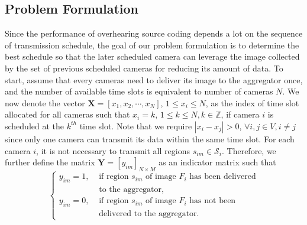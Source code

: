 \subsection{Problem Formulation}
Since the performance of overhearing source coding depends a lot on the sequence of transmission schedule, the goal of our problem formulation is to determine the best schedule so that the later scheduled camera can leverage the image collected by the set of previous scheduled cameras for reducing its amount of data.
To start, assume that every cameras need to deliver its image to the aggregator once, and the number of available time slots is equivalent to number of cameras $N$.
We now denote the vector ${\mathbf{X} = [x_1, x_2, \cdots, x_N]}$, ${1 \leq x_i \leq N}$, as the index of time slot allocated for all cameras such that $x_i = k$, ${1 \leq k \leq N, k \in \mathbb{Z}}$, if camera $i$ is scheduled at the $k^{th}$ time slot.
Note that we require ${|x_i - x_j| > 0}$, ${\forall i,j \in V, i \neq j }$ since only one camera can transmit its data within the same time slot.
For each camera $i$, it is not necessary to transmit all regions $s_{im} \in \mathcal{S}_i$.
Therefore, we further define the matrix ${\mathbf{Y} = [y_{im}]_{N \times M}}$ as an indicator matrix such that
\begin{equation*}
\left\{ \begin{array}{ll}
y_{im} = 1, &\text{ if region $s_{im}$ of image $F_i$ has been delivered} \\
                   &\text{ to the aggregator,} \\
y_{im} = 0, &\text{ if region $s_{im}$ of image $F_i$ has not been} \\
                   &\text{ delivered to the aggregator.}
\end{array} \right.
\end{equation*}

